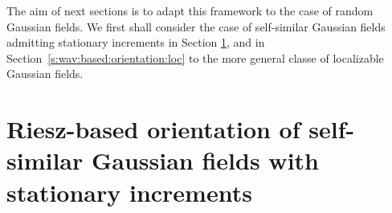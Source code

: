 \documentclass{elsarticle}
\def\Z{\mbox{$\mathbb{Z}$}}
\begin{document}
%
%

The aim of next sections is to adapt this framework to the case of random Gaussian fields. We first shall consider the case of self-similar Gaussian fields admitting stationary increments in Section \ref{s:self-similar}, and in Section~\ref{s:wav:based:orientation:loc} to the more general classe of localizable Gaussian fields. 

\section{Riesz-based orientation of self-similar Gaussian fields with stationary increments}\label{s:self-similar}
\end{document}
